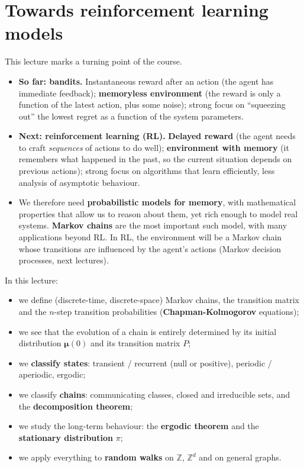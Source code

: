 

\section{Towards reinforcement learning models}

This lecture marks a turning point of the course.
\begin{itemize}
    \item \textbf{So far: bandits.} Instantaneous reward after an action (the agent has immediate feedback); \textbf{memoryless environment} (the reward is only a function of the latest action, plus some noise); strong focus on ``squeezing out'' the lowest regret as a function of the system parameters.
    \item \textbf{Next: reinforcement learning (RL).} \textbf{Delayed reward} (the agent needs to craft \emph{sequences} of actions to do well); \textbf{environment with memory} (it remembers what happened in the past, so the current situation depends on previous actions); strong focus on algorithms that learn efficiently, less analysis of asymptotic behaviour.
    \item We therefore need \textbf{probabilistic models for memory}, with mathematical properties that allow us to reason about them, yet rich enough to model real systems. \textbf{Markov chains} are the most important such model, with many applications beyond RL. In RL, the environment will be a Markov chain whose transitions are influenced by the agent's actions (Markov decision processes, next lectures).
\end{itemize}
In this lecture:
\begin{itemize}
    \item we define (discrete-time, discrete-space) Markov chains, the transition matrix and the $n$-step transition probabilities (\textbf{Chapman-Kolmogorov} equations);
    \item we see that the evolution of a chain is entirely determined by its initial distribution $\boldsymbol{\mu}(0)$ and its transition matrix $P$;
    \item we \textbf{classify states}: transient / recurrent (null or positive), periodic / aperiodic, ergodic;
    \item we classify \textbf{chains}: communicating classes, closed and irreducible sets, and the \textbf{decomposition theorem};
    \item we study the long-term behaviour: the \textbf{ergodic theorem} and the \textbf{stationary distribution} $\pi$;
    \item we apply everything to \textbf{random walks} on $\mathbb{Z}$, $\mathbb{Z}^d$ and on general graphs.
\end{itemize}
